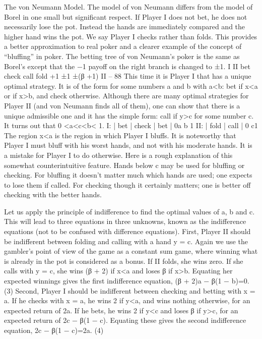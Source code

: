 \documentclass[]{report}
\begin{document}
The von Neumann Model. The model of von Neumann differs from the model of
Borel in one small but significant respect. If Player I does not bet, he does not necessarily
lose the pot. Instead the hands are immediately compared and the higher hand wins the
pot. We say Player I checks rather than folds. This provides a better approximation to
real poker and a clearer example of the concept of “bluffing” in poker. The betting tree of
von Neumann’s poker is the same as Borel’s except that the −1 payoff on the right branch
is changed to ±1.
I
II
bet check
call fold
+1
±1
±(β +1)
II – 88
This time it is Player I that has a unique optimal strategy. It is of the form for some
numbers a and b with a<b: bet if x<a or if x>b, and check otherwise. Although there
are many optimal strategies for Player II (and von Neumann finds all of them), one can
show that there is a unique admissible one and it has the simple form: call if y>c for
some number c. It turns out that 0 <a<c<b< 1.
I: | bet | check | bet |
0a b 1
II: | fold | call |
0 c1
The region x<a is the region in which Player I bluffs. It is noteworthy that Player
I must bluff with his worst hands, and not with his moderate hands. It is a mistake for
Player I to do otherwise. Here is a rough explanation of this somewhat counterintuitive
feature. Hands below c may be used for bluffing or checking. For bluffing it doesn’t matter
much which hands are used; one expects to lose them if called. For checking though it
certainly matters; one is better off checking with the better hands.

Let us apply the principle of indifference to find the optimal values of a, b and c. This
will lead to three equations in three unknowns, known as the indifference equations (not
to be confused with difference equations). First, Player II should be indifferent between
folding and calling with a hand y = c. Again we use the gambler’s point of view of the
game as a constant sum game, where winning what is already in the pot is considered as
a bonus. If II folds, she wins zero. If she calls with y = c, she wins (β + 2) if x<a and
loses β if x>b. Equating her expected winnings gives the first indifference equation,
(β + 2)a − β(1 − b)=0. (3)
Second, Player I should be indifferent between checking and betting with x = a. If
he checks with x = a, he wins 2 if y<a, and wins nothing otherwise, for an expected
return of 2a. If he bets, he wins 2 if y<c and loses β if y>c, for an expected return of
2c − β(1 − c). Equating these gives the second indifference equation,
2c − β(1 − c)=2a. (4)
\end{document}
